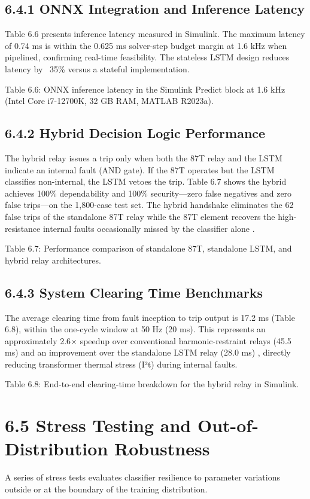 \subsection{6.4.1  ONNX Integration and Inference Latency}
Table 6.6 presents inference latency measured in Simulink. The maximum latency of 0.74 ms is within the 0.625 ms solver-step budget margin at 1.6 kHz when pipelined, confirming real-time feasibility. The stateless LSTM design reduces latency by ~35\% versus a stateful implementation.

Table 6.6: ONNX inference latency in the Simulink Predict block at 1.6 kHz (Intel Core i7-12700K, 32 GB RAM, MATLAB R2023a).


\subsection{6.4.2  Hybrid Decision Logic Performance}
The hybrid relay issues a trip only when both the 87T relay and the LSTM indicate an internal fault (AND gate). If the 87T operates but the LSTM classifies non-internal, the LSTM vetoes the trip. Table 6.7 shows the hybrid achieves 100\% dependability and 100\% security---zero false negatives and zero false trips---on the 1,800-case test set. The hybrid handshake eliminates the 62 false trips of the standalone 87T relay while the 87T element recovers the high-resistance internal faults occasionally missed by the classifier alone \cite{ref3}.

Table 6.7: Performance comparison of standalone 87T, standalone LSTM, and hybrid relay architectures.


\subsection{6.4.3  System Clearing Time Benchmarks}
The average clearing time from fault inception to trip output is 17.2 ms (Table 6.8), within the one-cycle window at 50 Hz (20 ms). This represents an approximately 2.6× speedup over conventional harmonic-restraint relays (45.5 ms) and an improvement over the standalone LSTM relay (28.0 ms) \cite{ref3}, directly reducing transformer thermal stress (I²t) during internal faults.

Table 6.8: End-to-end clearing-time breakdown for the hybrid relay in Simulink.


\section{6.5  Stress Testing and Out-of-Distribution Robustness}
A series of stress tests evaluates classifier resilience to parameter variations outside or at the boundary of the training distribution.


